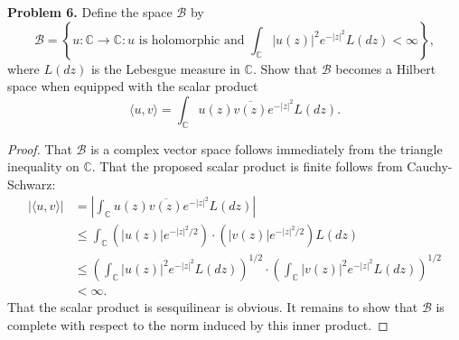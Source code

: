 \documentclass[11pt,letterpaper]{report}
\newcommand{\complex}{\mathbb{C}}
\newcommand{\mcal}[1]{\mathcal{#1}}
\begin{document}
\noindent\textbf{Problem 6. }Define the space $\mcal{B}$ by
\[
\mcal{B} = \left\{u:\complex\to \complex: u\text{ is holomorphic and }\int_\complex|u(z)|^2e^{-|z|^2}L(dz)<\infty\right\},
\]
where $L(dz)$ is the Lebesgue measure in $\complex$. Show that $\mcal{B}$ becomes a Hilbert space when equipped with the scalar product
\[
\langle u, v\rangle = \int_\complex u(z)\overline{v(z)}e^{-|z|^2} L(dz).
\]
\begin{proof}
	That $\mcal{B}$ is a complex vector space follows immediately from the triangle inequality on $\complex$. That the proposed scalar product is finite follows from Cauchy-Schwarz:
	\begin{align*}
		|\langle u, v\rangle| &= \left|\int_\complex u(z)\overline{v(z)}e^{-|z|^2}L(dz)\right|\\
		&\leq \int_\complex(|u(z)|e^{-|z|^2/2})\cdot (|v(z)|e^{-|z|^2/2})L(dz)\\
		&\leq \left(\int_\complex |u(z)|^2e^{-|z|^2}L(dz)\right)^{1/2}\cdot \left(\int_\complex |v(z)|^2e^{-|z|^2}L(dz)\right)^{1/2}\\
		&<\infty.
	\end{align*}
	That the scalar product is sesquilinear is obvious. It remains to show that $\mcal{B}$ is complete with respect to the norm induced by this inner product. 
\end{proof}
\end{document}
